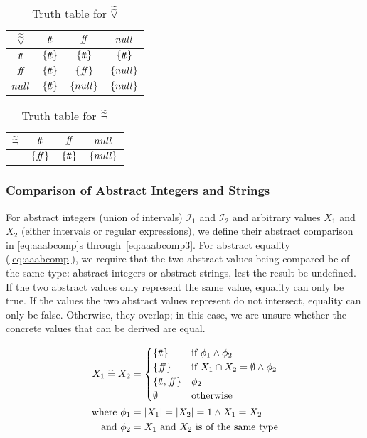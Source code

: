 \begin{table}[H]
    \centering
    \caption{Truth table for $\widetilde{\widetilde{\lor}}$}
    \begin{tabular}{c|ccc}
        $\widetilde{\widetilde{\lor}}$ & $t\!t$ & $f\!\!f$ & $null$ \\
        \hline
        $t\!t$ & $\{t\!t\}$ & $\{t\!t\}$ & $\{t\!t\}$ \\
        $f\!\!f$ & $\{t\!t\}$ & $\{f\!\!f\}$ & $\{null\}$ \\
        $null$ & $\{t\!t\}$ & $\{null\}$ & $\{null\}$ \\
    \end{tabular}
    \label{tab:aaablor}
\end{table}

\begin{table}[H]
    \centering
    \caption{Truth table for $\widetilde{\widetilde{\neg}}$}
    \begin{tabular}{c|ccc}
        $\widetilde{\widetilde{\neg}}$ & $t\!t$ & $f\!\!f$ & $null$ \\
        \hline
        & $\{f\!\!f\}$ & $\{t\!t\}$ & $\{null\}$ \\
    \end{tabular}
    \label{tab:aaabneg}
\end{table}

\subsubsection{Comparison of Abstract Integers and Strings}\label{subsubsec:abstract-comparison}
For abstract integers (union of intervals) $\mathscr{I}_1$ and $\mathscr{I}_2$ and arbitrary values $X_1$ and $X_2$ (either intervals or regular expressions), we define their abstract comparison in \autoref{eq:aaabcomp}s through~\ref{eq:aaabcomp3}.
For abstract equality (\autoref{eq:aaabcomp}), we require that the two abstract values being compared be of the same type: abstract integers or abstract strings, lest the result be undefined.
If the two abstract values only represent the same value, equality can only be true.
If the values the two abstract values represent do not intersect, equality can only be false.
Otherwise, they overlap; in this case, we are unsure whether the concrete values that can be derived are equal.

\begin{align} \nonumber
    X_1 \;\aab{=}\; X_2 &= \begin{cases}
        \{\true\} & \text{if } \phi_1 \land \phi_2 \\
        \{\false\} & \text{if } X_1 \cap X_2 = \emptyset \land \phi_2 \\
        \{\true, \false\} & \phi_2 \\
        \emptyset & \text{otherwise}
    \end{cases}\\
    \text{where } \phi_1&=|X_1| = |X_2| = 1 \land X_1 = X_2 \nonumber\\
    \text{and } \phi_2&=X_1 \text{ and } X_2 \text{ is of the same type}
    \label{eq:aaabcomp}
\end{align}

